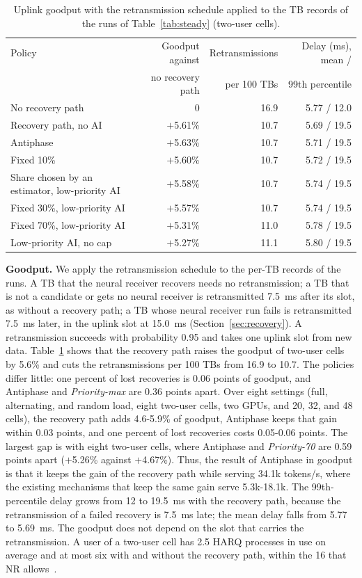 \documentclass[acmsmall,screen,review,anonymous]{acmart}
\newcommand{\sys}{Antiphase\xspace}
\begin{document}
\begin{table}[t]
\caption{Uplink goodput with the retransmission schedule applied to the TB records of the runs of
Table~\ref{tab:steady} (two-user cells).}
\label{tab:goodput}
\footnotesize
\begin{tabular}{@{}lrrr@{}}
\toprule
Policy & Goodput against & Retransmissions & Delay (ms), mean / \\
 & no recovery path & per 100 TBs & 99th percentile \\
\midrule
No recovery path & 0 & 16.9 & 5.77 / 12.0 \\
Recovery path, no AI & $+$5.61\% & 10.7 & 5.69 / 19.5 \\
\sys & $+$5.63\% & 10.7 & 5.71 / 19.5 \\
Fixed 10\% & $+$5.60\% & 10.7 & 5.72 / 19.5 \\
Share chosen by an estimator, low-priority AI & $+$5.58\% & 10.7 & 5.74 / 19.5 \\
Fixed 30\%, low-priority AI & $+$5.57\% & 10.7 & 5.74 / 19.5 \\
Fixed 70\%, low-priority AI & $+$5.31\% & 11.0 & 5.78 / 19.5 \\
Low-priority AI, no cap & $+$5.27\% & 11.1 & 5.80 / 19.5 \\
\bottomrule
\end{tabular}
\end{table}

\noindent\textbf{Goodput.} We apply the retransmission schedule to the per-TB records of the runs. A TB that
the neural receiver recovers needs no retransmission; a TB that is not a candidate or gets no neural
receiver is retransmitted 7.5~ms after its slot, as without a recovery path; a TB whose neural receiver run
fails is retransmitted 7.5~ms later, in the uplink slot at 15.0~ms (Section~\ref{sec:recovery}). A retransmission succeeds with probability 0.95 and takes one uplink
slot from new data. Table~\ref{tab:goodput} shows that the recovery path raises the goodput of two-user
cells by 5.6\% and cuts the retransmissions per 100 TBs from 16.9 to 10.7. The policies differ little: one
percent of lost recoveries is 0.06 points of goodput, and \sys and \textit{Priority-max} are 0.36 points
apart. Over eight settings (full, alternating, and random load, eight two-user cells, two GPUs, and 20,
32, and 48 cells), the recovery path adds 4.6-5.9\% of goodput, \sys keeps that gain within 0.03 points,
and one percent of lost recoveries costs 0.05-0.06 points. The largest gap is with eight two-user cells,
where \sys and \textit{Priority-70} are 0.59 points apart ($+$5.26\% against $+$4.67\%). Thus, the result of \sys in goodput is that it keeps the gain of the recovery path while serving
34.1k tokens/s, where the existing mechanisms that keep the same gain serve 5.3k-18.1k. The 99th-percentile
delay grows from 12 to 19.5~ms with the recovery path, because the retransmission of a failed recovery is
7.5~ms late; the mean delay falls from 5.77 to 5.69~ms. The goodput does not depend on the slot that carries the retransmission. A user of a two-user cell has 2.5 HARQ processes in use on average and at
most six with and without the recovery path, within the 16 that NR allows~\cite{ts38214}.
\end{document}

